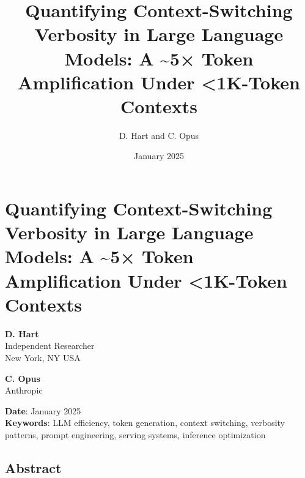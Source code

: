 \documentclass[
  11pt]{article}
\title{Quantifying Context-Switching Verbosity in Large Language Models:
A \textasciitilde5× Token Amplification Under \textless1K-Token
Contexts}
\author{D. Hart and C. Opus}
\date{January 2025}
\begin{document}
\maketitle

\section{Quantifying Context-Switching Verbosity in Large Language
Models: A \textasciitilde5× Token Amplification Under \textless1K-Token
Contexts}\label{quantifying-context-switching-verbosity-in-large-language-models-a-5-token-amplification-under-1k-token-contexts}

\textbf{D. Hart}\\
Independent Researcher\\
New York, NY USA

\textbf{C. Opus}\\
Anthropic

\textbf{Date}: January 2025\\
\textbf{Keywords}: LLM efficiency, token generation, context switching,
verbosity patterns, prompt engineering, serving systems, inference
optimization

\subsection{Abstract}\label{abstract}
\end{document}
